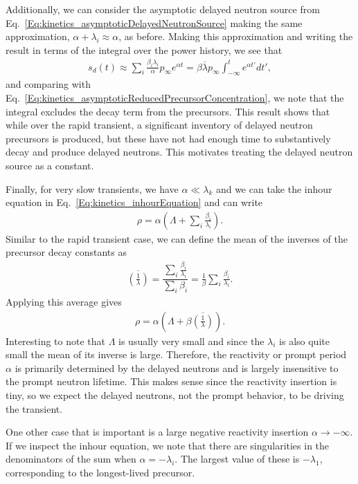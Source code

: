 Additionally, we can consider the asymptotic delayed neutron source from Eq.~\eqref{Eq:kinetics_asymptoticDelayedNeutronSource} making the same approximation, $\alpha + \lambda_i \approx \alpha$, as before. Making this approximation and writing the result in terms of the integral over the power history, we see that
\begin{align}
  s_d(t) \approx \sum_i \frac{ \beta_i \lambda_i }{ \alpha }  p_\infty e^{\alpha t} = \beta \overline{\lambda} p_\infty \int_{-\infty}^t e^{\alpha t'} dt' ,
\end{align}
and comparing with Eq.~\eqref{Eq:kinetics_asymptoticReducedPrecursorConcentration}, we note that the integral excludes the decay term from the precursors. This result shows that while over the rapid transient, a significant inventory of delayed neutron precursors is produced, but these have not had enough time to substantively decay and produce delayed neutrons. This motivates treating the delayed neutron source as a constant.

Finally, for very slow transients, we have $\alpha \ll \lambda_k$ and we can take the inhour equation in Eq.~\eqref{Eq:kinetics_inhourEquation} and can write
\begin{align}
  \rho = \alpha \left( \Lambda +  \sum_i \frac{ \beta_i }{ \lambda_i } \right). 
\end{align}
Similar to the rapid transient case, we can define the mean of the inverses of the precursor decay constants as
\begin{align}
  \overline{\left(\frac{1}{\lambda}\right)} = \dfrac{ \displaystyle\sum_i \frac{\beta_i}{\lambda_i} }{ \displaystyle\sum_i \beta_i } = \frac{1}{\beta} \displaystyle\sum_i \frac{\beta_i}{\lambda_i} .
\end{align}
Applying this average gives
\begin{align}
  \rho = \alpha \left( \Lambda +  \beta  \overline{\left(\frac{1}{\lambda}\right)} \right). 
\end{align}
Interesting to note that $\Lambda$ is usually very small and since the $\lambda_i$ is also quite small the mean of its inverse is large. Therefore, the reactivity or prompt period $\alpha$ is primarily determined by the delayed neutrons and is largely insensitive to the prompt neutron lifetime. This makes sense since the reactivity insertion is tiny, so we expect the delayed neutrons, not the prompt behavior, to be driving the transient.

One other case that is important is a large negative reactivity insertion $\alpha \rightarrow -\infty$. If we inspect the inhour equation, we note that there are singularities in the denominators of the sum when $\alpha = -\lambda_i$. The largest value of these is $-\lambda_1$, corresponding to the longest-lived precursor. 


